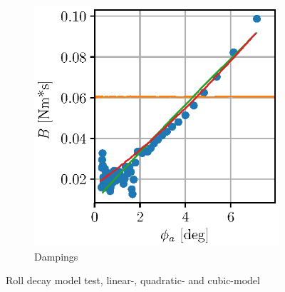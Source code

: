 \begin{figure}[H]
\begin{subfigure}[b]{0.45\textwidth}
        \includegraphics[]{figures/roll_decay_damping.eps}
        \caption{Dampings}
        \label{fig:roll_decay_damping}
    \end{subfigure}
    \caption{Roll decay model test, linear-, quadratic- and cubic-model}
    \label{fig:roll_decay}
\end{figure}


